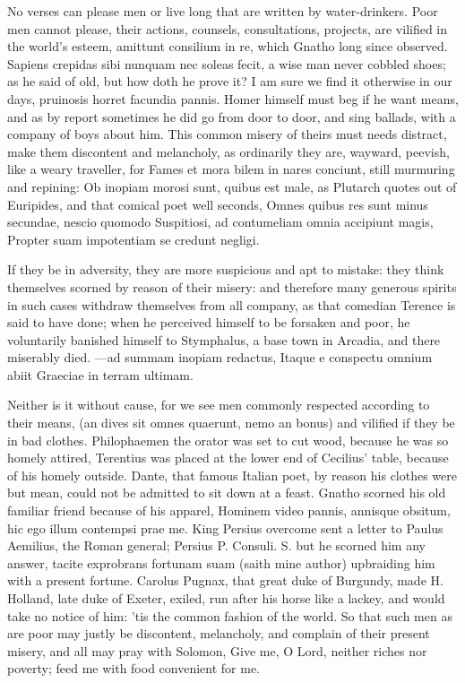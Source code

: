{No verses can please men or live long that are written by
water-drinkers. Poor men cannot please, their actions, counsels,
consultations, projects, are vilified in the world's esteem, amittunt
consilium in re, which Gnatho long since observed. Sapiens
crepidas sibi nunquam nec soleas fecit, a wise man never cobbled shoes;
as he said of old, but how doth he prove it? I am sure we find it
otherwise in our days,  pruinosis horret facundia pannis. Homer
himself must beg if he want means, and as by report sometimes he did
go from door to door, and sing ballads, with a company of boys
about him. This common misery of theirs must needs distract, make them
discontent and melancholy, as ordinarily they are, wayward, peevish,
like a weary traveller, for  Fames et mora bilem in nares
conciunt, still murmuring and repining: Ob inopiam morosi sunt, quibus
est male, as Plutarch quotes out of Euripides, and that comical poet
well seconds,
Omnes quibus res sunt minus secundae, nescio quomodo
Suspitiosi, ad contumeliam omnia accipiunt magis,
Propter suam impotentiam se credunt negligi.

If they be in adversity, they are more suspicious and apt to mistake:
they think themselves scorned by reason of their misery: and therefore
many generous spirits in such cases withdraw themselves from all
company, as that comedian Terence is said to have done; when he
perceived himself to be forsaken and poor, he voluntarily banished
himself to Stymphalus, a base town in Arcadia, and there miserably
died.
---ad summam inopiam redactus,
Itaque e conspectu omnium abiit Graeciae in terram ultimam.

Neither is it without cause, for we see men commonly respected
according to their means, (an dives sit omnes quaerunt, nemo an
bonus) and vilified if they be in bad clothes. Philophaemen the
orator was set to cut wood, because he was so homely attired,
Terentius was placed at the lower end of Cecilius' table, because
of his homely outside.  Dante, that famous Italian poet, by
reason his clothes were but mean, could not be admitted to sit down at
a feast. Gnatho scorned his old familiar friend because of his apparel,
Hominem video pannis, annisque obsitum, hic ego illum contempsi
prae me. King Persius overcome sent a letter to Paulus Aemilius,
the Roman general; Persius P. Consuli. S. but he scorned him any
answer, tacite exprobrans fortunam suam (saith mine author) upbraiding
him with a present fortune. Carolus Pugnax, that great duke of
Burgundy, made H. Holland, late duke of Exeter, exiled, run after his
horse like a lackey, and would take no notice of him:  'tis the
common fashion of the world. So that such men as are poor may justly be
discontent, melancholy, and complain of their present misery, and all
may pray with Solomon, Give me, O Lord, neither riches nor
poverty; feed me with food convenient for me.

}
